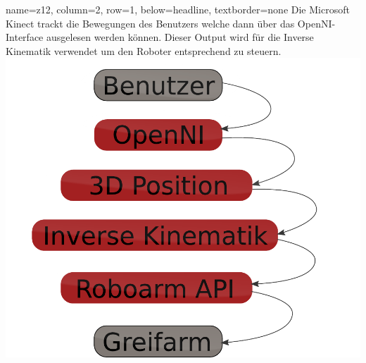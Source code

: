\documentclass[portrait,a0paper]{baposter}
\begin{document}
\begin{poster}
    {
    name=z12,
    column=2,
    row=1,
    below=headline,
    textborder=none
    }
    {
Die Microsoft Kinect trackt die Bewegungen des Benutzers welche dann über das OpenNI-Interface ausgelesen werden können. Dieser Output wird für die Inverse Kinematik verwendet um den Roboter entsprechend zu steuern.
\includegraphics[width=\textwidth]{imgs/komponenten.pdf}
 }
 
%



\end{poster}
\end{document}
